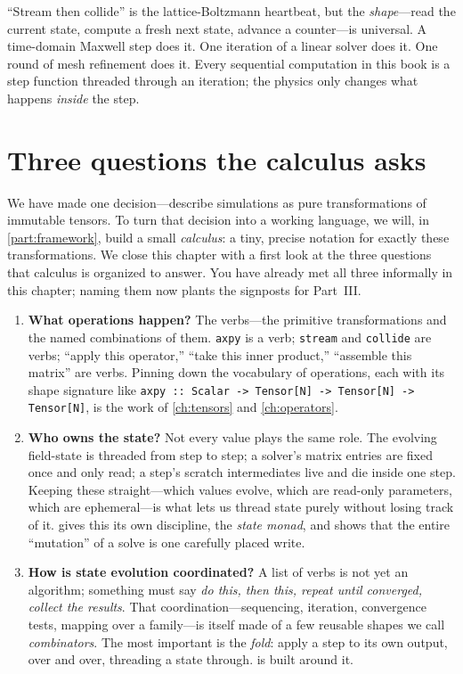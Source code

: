 \begin{physicsbox}
``Stream then collide'' is the lattice-Boltzmann heartbeat, but the
\emph{shape}---read the current state, compute a fresh next state, advance a
counter---is universal. A time-domain Maxwell step does it. One iteration of a
linear solver does it. One round of mesh refinement does it. Every sequential
computation in this book is a step function threaded through an iteration; the
physics only changes what happens \emph{inside} the step.
\end{physicsbox}

\section{Three questions the calculus asks}

We have made one decision---describe simulations as pure transformations of
immutable tensors. To turn that decision into a working language, we will, in
\cref{part:framework}, build a small \emph{calculus}: a tiny, precise notation for
exactly these transformations. We close this chapter with a first look at the
three questions that calculus is organized to answer. You have already met all
three informally in this chapter; naming them now plants the signposts for
Part~III.

\begin{enumerate}[label=\textbf{Q\arabic*.}, leftmargin=*]
  \item \textbf{What operations happen?} The verbs---the primitive
  transformations and the named combinations of them. \texttt{axpy} is a verb;
  \texttt{stream} and \texttt{collide} are verbs; ``apply this operator,''
  ``take this inner product,'' ``assemble this matrix'' are verbs. Pinning down
  the vocabulary of operations, each with its shape signature like
  \lstinline[style=l4style]|axpy :: Scalar -> Tensor[N] -> Tensor[N] -> Tensor[N]|,
  is the work of \cref{ch:tensors} and \cref{ch:operators}.

  \item \textbf{Who owns the state?} Not every value plays the same role. The
  evolving field-state is threaded from step to step; a solver's matrix entries
  are fixed once and only read; a step's scratch intermediates live and die
  inside one step. Keeping these straight---which values evolve, which are
  read-only parameters, which are ephemeral---is what lets us thread state purely
  without losing track of it.  gives this its own discipline,
  the \emph{state monad}, and shows that the entire ``mutation'' of a solve is one
  carefully placed write.

  \item \textbf{How is state evolution coordinated?} A list of verbs is not yet an
  algorithm; something must say \emph{do this, then this, repeat until converged,
  collect the results}. That coordination---sequencing, iteration, convergence
  tests, mapping over a family---is itself made of a few reusable shapes we call
  \emph{combinators}. The most important is the \emph{fold}: apply a step to its
  own output, over and over, threading a state through.  is built
  around it.
\end{enumerate}

